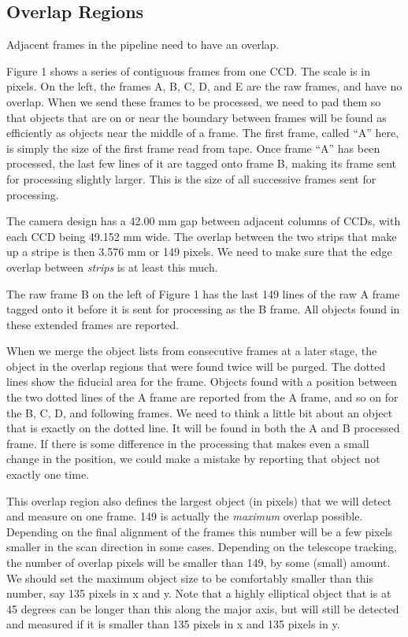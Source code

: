 \subsection{Overlap Regions}

Adjacent frames in the pipeline need to have an overlap.

Figure 1 shows a series of contiguous frames from one CCD.  The
scale is in pixels.  On the left, the frames A, B, C, D, and E
are the raw frames, and have no overlap.  When we send these frames
to be processed, we need to pad them so that objects that are on or
near the boundary between frames will be found as efficiently as
objects near the middle of a frame.
The first frame, called ``A'' here, 
is simply the size of the first frame read from tape.
Once frame ``A'' has been processed, the last few lines of it are
tagged onto frame B, making its frame sent for processing slightly larger.
This is the size of all successive frames sent for processing.

The camera design has a 42.00 mm gap between adjacent columns of CCDs,
with each CCD being 49.152 mm wide.  The overlap between the two strips
that make up a stripe is then 3.576 mm or 149 pixels.  We need to make
sure that the edge overlap between {\em strips} is at least this much.

The raw frame B on the left of Figure 1 has the last 149 lines of
the raw A frame tagged onto it before it is sent for processing
as the B frame.  All objects found in these extended frames are 
reported.

When we merge the object lists from consecutive frames at a later stage,
the object in the overlap regions that were found twice will be purged.
The dotted lines show the fiducial area for the
frame.  Objects found with a position between the two dotted lines
of the A frame are reported from the A frame, and so on for the B, C,
D, and following frames.   We need to think a little bit about an object
that is exactly on the dotted line.  It will be found in both the A and B
processed frame.  If there is some difference in the processing that
makes even a small change in the position, we could make a mistake by
reporting that object not exactly one time.

This overlap region also defines the largest object (in pixels) that we will
detect and measure on one frame.  
149 is actually the {\em maximum} overlap possible.
Depending on the final alignment of the frames this number will be a few
pixels smaller in the scan direction in some cases.  Depending on the
telescope tracking, the number of overlap pixels will be smaller than
149, by some (small) amount.  We should set the maximum object size to
be comfortably smaller than this number, say 135 pixels in x and y.
Note that a highly elliptical object that is at 45 degrees can be longer
than this along the major axis, but will still be detected and measured
if it is smaller than 135 pixels in x and 135 pixels in y.

